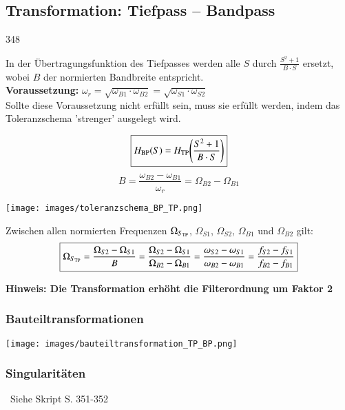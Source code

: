\subsection{Transformation: Tiefpass -- Bandpass}{348}

In der Übertragungsfunktion des Tiefpasses werden alle $S$ durch $\frac{S^2  + 1}{B \cdot S}$ ersetzt, wobei $B$ der normierten
Bandbreite entspricht. \\
\textbf{Voraussetzung:} $\omega_r = \sqrt{\omega_{B1} \cdot \omega_{B2}} = \sqrt{\omega_{S1} \cdot \omega_{S2} } $\\
Sollte diese Voraussetzung nicht erfüllt sein, muss sie erfüllt werden, indem das Toleranzschema 'strenger' ausgelegt wird.

\begin{minipage}[c]{0.4\columnwidth}
    $$ \boxed{H_{\rm BP}(S) = H_{\rm TP} \Bigg(\frac{S^2  + 1}{B \cdot S} \Bigg) } $$
    $$ \boxed{ B = \frac{\omega_{B2} - \omega_{B1}}{\omega_r} = \Omega_{B2} - \Omega_{B1} } $$
\end{minipage}
\hfill
\begin{minipage}[c]{0.58\columnwidth}
    \texttt{[image: images/toleranzschema\_BP\_TP.png]}
\end{minipage}

\vspace{0.2cm}
Zwischen allen normierten Frequenzen $\Omega_{S_{\rm TP}}$, $\Omega_{S1}$, $\Omega_{S2}$, $\Omega_{B1}$ und $\Omega_{B2}$ gilt:
$$ \boxed{ \Omega_{S_{\rm TP}} = \frac{\Omega_{S2} - \Omega_{S1}}{B} = \frac{\Omega_{S2} - \Omega_{S1}}{\Omega_{B2} - \Omega_{B1}}
    = \frac{\omega_{S2} - \omega_{S1}}{\omega_{B2} - \omega_{B1}} = \frac{f_{S2} - f_{S1}}{f_{B2} - f_{B1}} } $$

\textbf{Hinweis: Die Transformation erhöht die Filterordnung um Faktor 2}


\begin{minipage}[t]{0.48\columnwidth}
    \subsubsection{Bauteiltransformationen}

    \texttt{[image: images/bauteiltransformation\_TP\_BP.png]}
\end{minipage}
\hfill
\begin{minipage}[t]{0.48\columnwidth}
    \subsubsection{Singularitäten}

    \textrightarrow\ Siehe Skript S. 351-352
\end{minipage}



